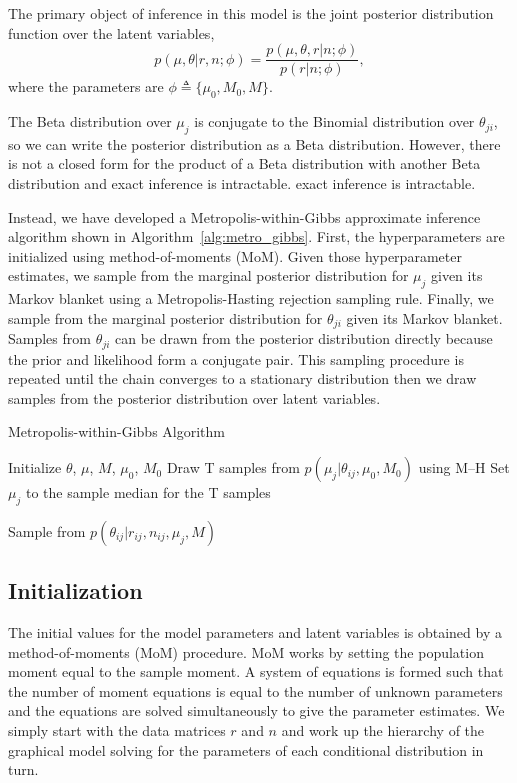 \documentclass[11pt,reqno]{amsart}
\begin{document}
The primary object of inference in this model is the joint posterior distribution function over the latent variables,
\begin{equation}
	p(\mu, \theta | r, n; \phi)  = \frac{ p(\mu, \theta, r | n; \phi) } {p ( r | n; \phi)},
\end{equation}
where the parameters are $\phi \triangleq \{\mu_0, M_0, M\}$.

The Beta distribution over $\mu_j$ is conjugate to the Binomial distribution over $\theta_{ji}$, so we can write the posterior distribution as a Beta distribution. However, there is not a closed form for the product of a Beta distribution with another Beta distribution and exact inference is intractable.  exact inference is intractable.

Instead, we have developed a Metropolis-within-Gibbs  approximate inference algorithm shown in Algorithm~\ref{alg:metro_gibbs}. First, the hyperparameters are initialized using method-of-moments (MoM). Given those hyperparameter estimates, we sample from the marginal posterior distribution for $\mu_j$ given its Markov blanket using a Metropolis-Hasting rejection sampling rule. Finally, we sample from the marginal posterior distribution for $\theta_{ji}$ given its Markov blanket. Samples from $\theta_{ji}$ can be drawn from the posterior distribution directly  because the prior and likelihood form a conjugate pair. This sampling procedure is repeated until the chain converges to a stationary distribution then we draw samples from the posterior distribution over latent variables.

\begin{algorithm}[ht]
\caption{Metropolis-within-Gibbs Algorithm}
\label{alg:metro_gibbs}
\begin{algorithmic}[1]

\State Initialize $\theta$, $\mu$, $M$, $\mu_0$, $M_0$
\Repeat
{} 
  \State Draw T samples from $p \left( \mu_j |\theta_{ij},\mu_0,M_0\right)$ using M--H
  \State Set $\mu_j$ to the sample median for the T samples
  
  
   
	\State Sample from $p \left( \theta_{ij} |r_{ij},n_{ij},\mu_j,M \right)$
  \EndFor

\EndFor
{}
\end{algorithmic}
\end{algorithm}

\subsection{Initialization}
The initial values for the model parameters and latent variables is obtained by a method-of-moments (MoM) procedure. MoM works by setting the population moment equal to the sample moment. A system of equations is formed such that the number of moment equations is equal to the number of unknown parameters and the equations are solved simultaneously to give the parameter estimates. We simply start with the data matrices $r$ and $n$ and work up the hierarchy of the graphical model solving for the parameters of each conditional distribution in turn.
\end{document}
